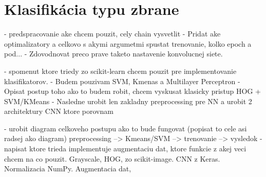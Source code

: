 
\section{Klasifikácia typu zbrane}
- predspracovanie ake chcem pouzit, cely chain vysvetlit
- Pridat ake optimalizatory a celkovo s akymi argumetmi spustat trenovanie, kolko epoch a pod...
- Zdovodnovat preco prave taketo nastavenie konvolucnej siete.

- spomenut ktore triedy zo scikit-learn chcem pouzit pre implementovanie klasifikatorov.
- Budem pouzivam SVM, Kmenas a Multilayer Perceptron
- Opisat postup toho ako to budem robit, chcem vyskusat klasicky pristup HOG + SVM/KMeans
- Nasledne urobit len zakladny preprocessing pre NN a urobit 2 architektury CNN ktore porovnam

- urobit diagram celkoveho postupu ako to bude fungovat (popisat to cele asi radsej ako diagram)
  preprocessing --> Kmeans/SVM --> trenovanie --> vysledok
- napisat ktore trieda implementuje augmentaciu dat, ktore funkcie z akej veci chcem na co pouzit.
  Grayscale, HOG, zo scikit-image. CNN z Keras. Normalizacia NumPy. Augmentacia dat, 

